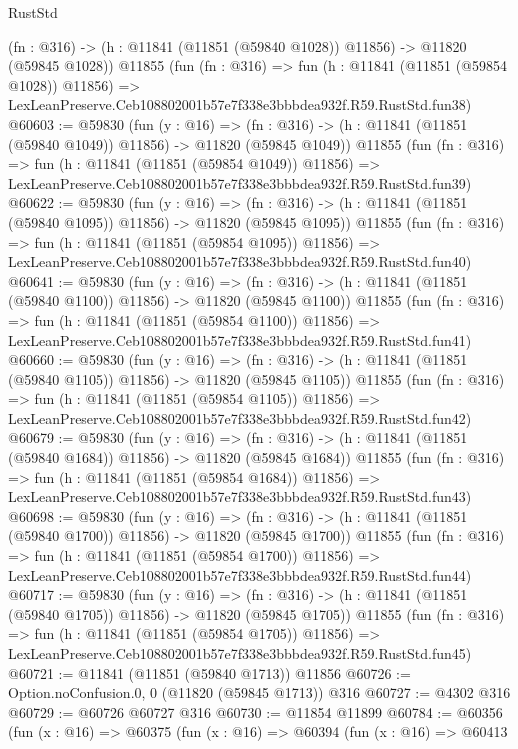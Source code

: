 \begin{lexlean}{RustStd}
\begin{coremodule}
    (fn : @316) -> (h : @11841 (@11851 (@59840 @1028)) @11856) -> @11820 (@59845 @1028))
    @11855
    (fun (fn : @316) =>
    fun (h : @11841 (@11851 (@59854 @1028)) @11856) =>
    LexLeanPreserve.Ceb108802001b57e7f338e3bbbdea932f.R59.RustStd.fun38)
@60603 := @59830
    (fun (y : @16) =>
    (fn : @316) -> (h : @11841 (@11851 (@59840 @1049)) @11856) -> @11820 (@59845 @1049))
    @11855
    (fun (fn : @316) =>
    fun (h : @11841 (@11851 (@59854 @1049)) @11856) =>
    LexLeanPreserve.Ceb108802001b57e7f338e3bbbdea932f.R59.RustStd.fun39)
@60622 := @59830
    (fun (y : @16) =>
    (fn : @316) -> (h : @11841 (@11851 (@59840 @1095)) @11856) -> @11820 (@59845 @1095))
    @11855
    (fun (fn : @316) =>
    fun (h : @11841 (@11851 (@59854 @1095)) @11856) =>
    LexLeanPreserve.Ceb108802001b57e7f338e3bbbdea932f.R59.RustStd.fun40)
@60641 := @59830
    (fun (y : @16) =>
    (fn : @316) -> (h : @11841 (@11851 (@59840 @1100)) @11856) -> @11820 (@59845 @1100))
    @11855
    (fun (fn : @316) =>
    fun (h : @11841 (@11851 (@59854 @1100)) @11856) =>
    LexLeanPreserve.Ceb108802001b57e7f338e3bbbdea932f.R59.RustStd.fun41)
@60660 := @59830
    (fun (y : @16) =>
    (fn : @316) -> (h : @11841 (@11851 (@59840 @1105)) @11856) -> @11820 (@59845 @1105))
    @11855
    (fun (fn : @316) =>
    fun (h : @11841 (@11851 (@59854 @1105)) @11856) =>
    LexLeanPreserve.Ceb108802001b57e7f338e3bbbdea932f.R59.RustStd.fun42)
@60679 := @59830
    (fun (y : @16) =>
    (fn : @316) -> (h : @11841 (@11851 (@59840 @1684)) @11856) -> @11820 (@59845 @1684))
    @11855
    (fun (fn : @316) =>
    fun (h : @11841 (@11851 (@59854 @1684)) @11856) =>
    LexLeanPreserve.Ceb108802001b57e7f338e3bbbdea932f.R59.RustStd.fun43)
@60698 := @59830
    (fun (y : @16) =>
    (fn : @316) -> (h : @11841 (@11851 (@59840 @1700)) @11856) -> @11820 (@59845 @1700))
    @11855
    (fun (fn : @316) =>
    fun (h : @11841 (@11851 (@59854 @1700)) @11856) =>
    LexLeanPreserve.Ceb108802001b57e7f338e3bbbdea932f.R59.RustStd.fun44)
@60717 := @59830
    (fun (y : @16) =>
    (fn : @316) -> (h : @11841 (@11851 (@59840 @1705)) @11856) -> @11820 (@59845 @1705))
    @11855
    (fun (fn : @316) =>
    fun (h : @11841 (@11851 (@59854 @1705)) @11856) =>
    LexLeanPreserve.Ceb108802001b57e7f338e3bbbdea932f.R59.RustStd.fun45)
@60721 := @11841 (@11851 (@59840 @1713)) @11856
@60726 := Option.noConfusion.{0, 0} (@11820 (@59845 @1713)) @316
@60727 := @4302 @316
@60729 := @60726 @60727 @316
@60730 := @11854 @11899
@60784 := @60356
    (fun (x : @16) =>
    @60375
      (fun (x : @16) =>
      @60394
        (fun (x : @16) =>
        @60413

\end{coremodule}
\end{lexlean}
